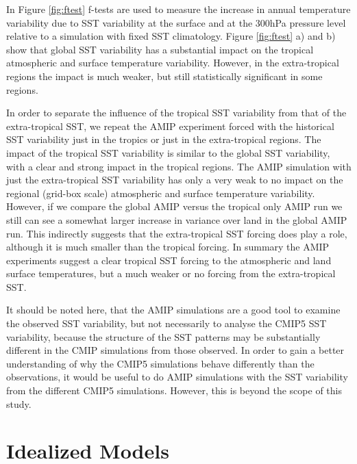 In Figure \ref{fig:ftest} f-tests are used to measure the increase in annual 
temperature variability due to SST variability at the surface and at the 300hPa 
pressure level relative to a simulation with fixed SST climatology. Figure  
\ref{fig:ftest} a) and b) show that global SST variability has a substantial 
impact on the tropical atmospheric and surface temperature variability. However, 
in the extra-tropical regions the impact is much weaker, but still statistically 
significant in some regions.

In order to separate the influence of the tropical SST variability from that of 
the extra-tropical SST, we repeat the AMIP experiment forced with the historical 
SST variability just in the tropics or just in the extra-tropical regions. The 
impact of the tropical SST variability is similar to the global SST variability, 
with a clear and strong impact in the tropical regions.  The AMIP simulation 
with just the extra-tropical SST variability has only a very weak to no impact 
on the regional (grid-box scale) atmospheric and surface temperature 
variability.  However, if we compare the global AMIP versus the tropical only 
AMIP run we still can see a somewhat larger increase in variance over land in 
the global AMIP run. This indirectly suggests that the extra-tropical SST 
forcing does play a role, although it is much smaller than the tropical forcing.  
In summary the AMIP experiments suggest a clear tropical SST forcing to the 
atmospheric and land surface temperatures, but a much weaker or no forcing from 
the extra-tropical SST.

It should be noted here, that the AMIP simulations are a good tool to examine 
the observed SST variability, but not necessarily to analyse the CMIP5 SST 
variability, because the structure of the SST patterns may be substantially 
different in the CMIP simulations from those observed. In order to gain a better 
understanding of why the CMIP5 simulations behave differently than the 
observations, it would be useful to do AMIP simulations with the SST variability 
from the different CMIP5 simulations. However, this is beyond the scope of this 
study.


\section{Idealized Models}

